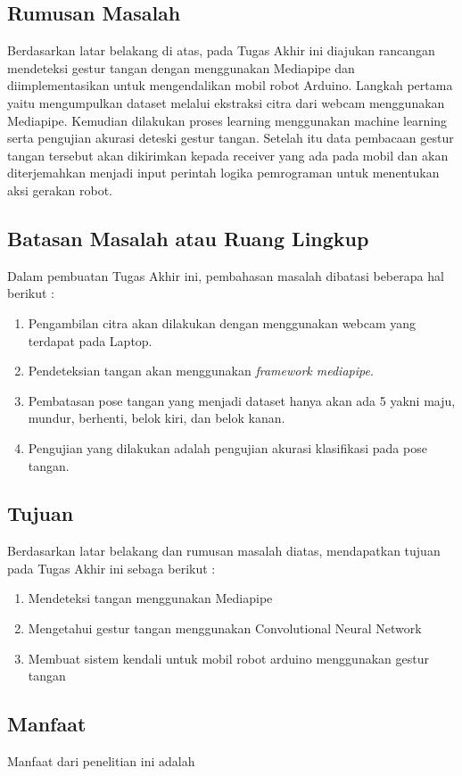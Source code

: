 \subsection{Rumusan Masalah}

Berdasarkan latar belakang di atas, pada Tugas Akhir ini diajukan rancangan mendeteksi gestur tangan dengan menggunakan Mediapipe dan diimplementasikan untuk mengendalikan mobil robot Arduino. Langkah pertama yaitu mengumpulkan dataset melalui ekstraksi citra dari webcam menggunakan Mediapipe. Kemudian dilakukan proses learning menggunakan machine learning serta pengujian akurasi deteski gestur tangan. Setelah itu data pembacaan gestur tangan tersebut akan dikirimkan kepada receiver yang ada pada mobil dan akan diterjemahkan menjadi input perintah logika pemrograman untuk menentukan aksi gerakan robot.

\subsection{Batasan Masalah atau Ruang Lingkup}

Dalam pembuatan Tugas Akhir ini, pembahasan masalah dibatasi beberapa hal berikut :
\begin{enumerate}
	\item Pengambilan citra akan dilakukan dengan menggunakan webcam yang terdapat pada Laptop.
	\item Pendeteksian tangan akan menggunakan \textit{framework mediapipe}.
	\item Pembatasan pose tangan yang menjadi dataset hanya akan ada 5 yakni maju, mundur, berhenti, belok kiri, dan belok kanan.
	\item Pengujian yang dilakukan adalah pengujian akurasi klasifikasi pada pose tangan.
\end{enumerate}

\subsection{Tujuan}

Berdasarkan latar belakang dan rumusan masalah diatas, mendapatkan tujuan pada Tugas Akhir ini sebaga berikut :
\begin{enumerate}
	\item Mendeteksi tangan menggunakan Mediapipe
	\item Mengetahui gestur tangan menggunakan Convolutional Neural Network
	\item Membuat sistem kendali untuk mobil robot arduino menggunakan gestur tangan
\end{enumerate}

\subsection{Manfaat}

Manfaat dari penelitian ini adalah \lipsum[8][1-14]
